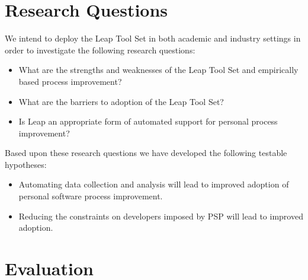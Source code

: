 \section*{Research Questions}

We intend to deploy the Leap Tool Set in both academic and industry
settings in order to investigate the following research questions:
\begin{itemize}
  
\item{What are the strengths and weaknesses of the Leap Tool Set and
    empirically based process improvement?}

\item{What are the barriers to adoption of the Leap Tool Set?}
  


  
\item{Is Leap an appropriate form of automated support for personal process
    improvement?}

\end{itemize}

Based upon these research questions we have developed the following 
testable hypotheses:
\begin{itemize}
\item{Automating data collection and analysis will lead to improved
    adoption of personal software process improvement.}

\item {Reducing the constraints on developers imposed by PSP will lead to
    improved adoption.}
  
\end{itemize}

\section*{Evaluation}


